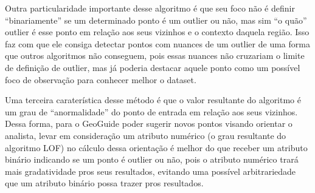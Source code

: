 Outra particularidade importante desse algoritmo é que seu foco não é definir ``binariamente'' se um determinado ponto é um outlier ou não, mas sim ``o quão'' outlier é esse ponto em relação aos seus vizinhos e o contexto daquela região. Isso faz com que ele consiga detectar pontos com nuances de um outlier de uma forma que outros algoritmos não conseguem, pois essas nuances não cruzariam o limite de definição de outlier, mas já poderia destacar aquele ponto como um possível foco de observação para conhecer melhor o dataset.

Uma terceira caraterística desse método é que o valor resultante do algoritmo é um grau de ``anormalidade'' do ponto de entrada em relação aos seus vizinhos. Dessa forma, para o GeoGuide poder sugerir novos pontos visando orientar o analista, levar em consideração um atributo numérico (o grau resultante do algoritmo LOF) no cálculo dessa orientação é melhor do que receber um atributo binário indicando se um ponto é outlier ou não, pois o atributo numérico trará mais gradatividade pros seus resultados, evitando uma possível arbitrariedade que um atributo binário possa trazer pros resultados.